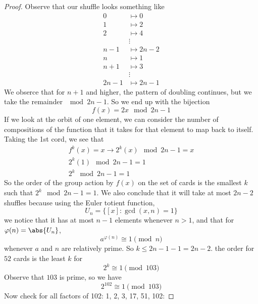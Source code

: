 \documentclass{article}
\begin{document}
\begin{proof}
	Observe that our shuffle looks something like
	\begin{align*}
		0 &\mapsto 0 \\
		1 &\mapsto 2 \\
		2 &\mapsto 4 \\
		  &\vdots \\
		n - 1 &\mapsto 2n - 2 \\
		n &\mapsto 1 \\
		n + 1 &\mapsto 3 \\
		      &\vdots \\
		2n - 1 &\mapsto 2n - 1
	\end{align*}
	We obserce that for $n + 1$ and higher, the pattern of doubling continues, but we take the remainder $\mod{2n - 1}$. So we end up with the bijection
	\begin{equation*}
		f(x) = 2x \mod{2n - 1}
	\end{equation*}
	If we look at the orbit of one element, we can consider the number of compositions of the function that it takes for that element to map back to itself. Taking the 1st cord, we see that
	\begin{align*}
		f^{k}(x) = x \rightarrow 2^{k}(x) \mod{2n - 1} = x \\
		2^{k}(1) \mod{2n - 1} = 1\\
		2^{k} \mod{2n - 1} = 1
	\end{align*}
	So the order of the group action by $f(x)$ on the set of cards is the smallest $k$ such that $2^{k} \mod{2n - 1} = 1$. We also conclude that it will take at most $2n - 2$ shuffles because using the Euler totient function,
	\begin{equation*}
		U_{n} = \{[x] : \gcd{(x,n)} = 1\}
	\end{equation*}
	we notice that it has at most $n - 1$ elements whenever $n > 1$, and that for $\varphi(n) = \abs{U_{n}}$, 
	\begin{equation*}
		a^{\varphi(n)} \cong 1 \pmod{n}
	\end{equation*}
	whenever $a$ and $n$ are relatively prime. So $k \leq 2n - 1 - 1 = 2n - 2$. the order for $52$ cards is the least $k$ for 
	\begin{equation*}
		2^{k} \cong 1 \pmod{103}
	\end{equation*}
	Observe that $103$ is prime, so we have
	\begin{equation*}
		2^{102} \cong 1 \pmod{103}
	\end{equation*}
	Now check for all factors of 102: 1, 2, 3, 17, 51, 102:

\end{proof}
\end{document}
